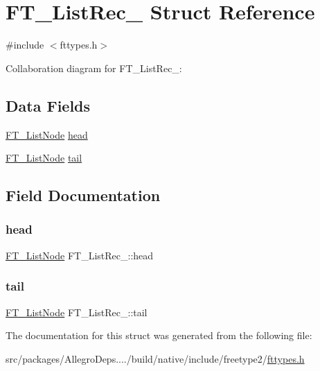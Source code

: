 \hypertarget{struct_f_t___list_rec__}{}\section{F\+T\+\_\+\+List\+Rec\+\_\+ Struct Reference}
\label{struct_f_t___list_rec__}


{\ttfamily \#include $<$fttypes.\+h$>$}



Collaboration diagram for F\+T\+\_\+\+List\+Rec\+\_\+\+:
\subsection*{Data Fields}
\begin{DoxyCompactItemize}
\item 
\hyperlink{fttypes_8h_a155e4980a42c16fbc221ad40b2b59695}{F\+T\+\_\+\+List\+Node} \hyperlink{struct_f_t___list_rec___a09ed35c2bcdc1c3acd12ff4650dfdeb9}{head}
\item 
\hyperlink{fttypes_8h_a155e4980a42c16fbc221ad40b2b59695}{F\+T\+\_\+\+List\+Node} \hyperlink{struct_f_t___list_rec___a4664761f0ab2af3d48231b00cd978b23}{tail}
\end{DoxyCompactItemize}


\subsection{Field Documentation}
\mbox{\label{struct_f_t___list_rec___a09ed35c2bcdc1c3acd12ff4650dfdeb9}} 
\subsubsection{\texorpdfstring{head}{head}}
{\footnotesize\ttfamily \hyperlink{fttypes_8h_a155e4980a42c16fbc221ad40b2b59695}{F\+T\+\_\+\+List\+Node} F\+T\+\_\+\+List\+Rec\+\_\+\+::head}

\mbox{\label{struct_f_t___list_rec___a4664761f0ab2af3d48231b00cd978b23}} 
\subsubsection{\texorpdfstring{tail}{tail}}
{\footnotesize\ttfamily \hyperlink{fttypes_8h_a155e4980a42c16fbc221ad40b2b59695}{F\+T\+\_\+\+List\+Node} F\+T\+\_\+\+List\+Rec\+\_\+\+::tail}



The documentation for this struct was generated from the following file\+:\begin{DoxyCompactItemize}
\item 
src/packages/\+Allegro\+Deps..../build/native/include/freetype2/\hyperlink{fttypes_8h}{fttypes.\+h}\end{DoxyCompactItemize}
